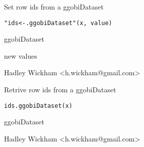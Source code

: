 \documentclass{article}
\begin{document}
\begin{Description}\relax
Set row ids from a ggobiDataset
\end{Description}
\begin{Usage}
\begin{verbatim}"ids<-.ggobiDataset"(x, value)\end{verbatim}
\end{Usage}
\begin{Arguments}
\begin{ldescription}
\item[\code{x}] ggobiDataset
\item[\code{value}] new values
\end{ldescription}
\end{Arguments}
\begin{Details}\relax
\end{Details}
\begin{Author}\relax
Hadley Wickham <h.wickham@gmail.com>
\end{Author}
\begin{SeeAlso}\relax
{}
\end{SeeAlso}
\begin{Examples}
\begin{ExampleCode}\end{ExampleCode}
\end{Examples}

\begin{Description}\relax
Retrive row ids from a ggobiDataset
\end{Description}
\begin{Usage}
\begin{verbatim}ids.ggobiDataset(x)\end{verbatim}
\end{Usage}
\begin{Arguments}
\begin{ldescription}
\item[\code{x}] ggobiDataset
\end{ldescription}
\end{Arguments}
\begin{Details}\relax
\end{Details}
\begin{Author}\relax
Hadley Wickham <h.wickham@gmail.com>
\end{Author}
\begin{SeeAlso}\relax
{}
\end{SeeAlso}
\begin{Examples}
\begin{ExampleCode}\end{ExampleCode}
\end{Examples}
\end{document}
